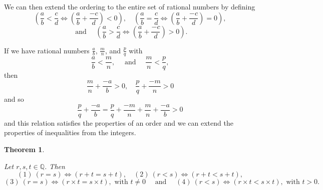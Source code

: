 \documentclass[
]{book}
\newtheorem{theorem}{Theorem}[chapter]
\theoremstyle{definition}
\theoremstyle{definition}
\theoremstyle{definition}
\theoremstyle{definition}
\theoremstyle{remark}
\begin{document}
We can then extend the ordering to the entire set of rational numbers by defining
\[\left(\frac{a}{b} < \frac{c}{d} \Leftrightarrow \left(\frac{a}{b} + \frac{-c}{d}\right) <0 \right), \quad
\left(\frac{a}{b} = \frac{c}{d} \Leftrightarrow \left(\frac{a}{b} + \frac{-c}{d}\right) = 0 \right),\]
\[\mbox{ and } \quad \left(\frac{a}{b} > \frac{c}{d} \Leftrightarrow \left(\frac{a}{b} + \frac{-c}{d}\right) > 0 \right).\]

If we have rational numbers \(\frac{a}{b}\), \(\frac{m}{n}\), and \(\frac{p}{q}\) with
\[\frac{a}{b} < \frac{m}{n}, \quad \mbox{ and } \quad \frac{m}{n} < \frac{p}{q},\] then
\[\frac{m}{n}+ \frac{-a}{b} >0, \quad \frac{p}{q}+ \frac{-m}{n} >0\] and so
\[\frac{p}{q} + \frac{-a}{b} = \frac{p}{q}+ \frac{-m}{n} + \frac{m}{n}+ \frac{-a}{b}>0\]
and this relation satisfies the properties of an order and we can extend the properties of inequalities from the integers.

\begin{theorem}
\protect\hypertarget{thm:unlabeled-div-43}{}\label{thm:unlabeled-div-43}

Let \(r,s,t\in \mathbb{Q}\). Then \[(1) \: (r=s) \Leftrightarrow (r+t=s+t),  \quad (2) \: (r<s) \Leftrightarrow (r+t<s+t),\]
\[(3) \: (r=s) \Leftrightarrow (r\times t=s\times t), \mbox{ with } t\neq 0 \quad \mbox{ and } \quad (4) \: (r<s) \Leftrightarrow (r\times t<s\times t), \mbox{ with } t> 0.\]

\end{theorem}
\end{document}
